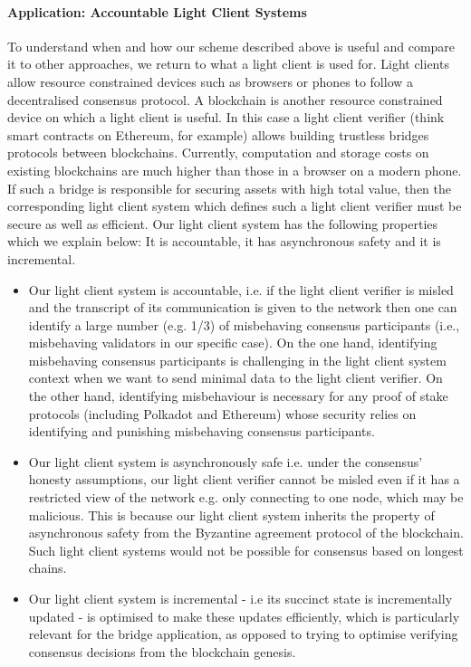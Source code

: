 \paragraph{Application: Accountable Light Client Systems} To understand when and how our scheme described above is useful and compare it to other 
approaches, we return to what a light client is used for. Light clients allow resource constrained devices such as browsers or phones to follow a decentralised 
consensus protocol. A blockchain is another resource constrained device on which a light client is useful. In this case a light client verifier (think smart contracts on 
Ethereum, for example) allows building trustless bridges protocols between blockchains. %
Currently, computation and storage 
costs on existing blockchains are much higher than those in a browser on a modern phone. If such a bridge is responsible for securing assets with high total value, 
then the corresponding light client system which defines such a light client verifier must be secure as well as efficient. Our light client system has the following properties 
which we explain below: It is accountable, it has asynchronous safety and it is incremental.  

\begin{itemize}
\item Our light client system is accountable, i.e. if the light client verifier is misled and the transcript of its communication is given to the network then one can identify a large 
number (e.g. 1/3) of misbehaving consensus participants (i.e., misbehaving validators in our specific case). On the one hand, identifying misbehaving consensus participants 
is challenging in the light client system context when we want to send minimal data to the light client verifier. On the other hand, 
identifying misbehaviour is necessary for any proof of stake protocols (including Polkadot and Ethereum) 
whose security relies on identifying and punishing misbehaving consensus participants. 
\item Our light client system is asynchronously safe i.e. under the consensus' honesty assumptions, our light client verifier cannot be misled even if it has a restricted view of the 
network e.g. only connecting to one node, which may be malicious. This is because our light client system inherits the property of asynchronous safety from the Byzantine agreement 
protocol of the blockchain. Such light client systems would not be possible for consensus based on longest chains.  
\item Our light client system is incremental - i.e its succinct state is incrementally updated - is optimised to make these updates efficiently, which is particularly relevant for the bridge 
application, as opposed to trying to optimise verifying consensus decisions from the blockchain genesis.
\end{itemize}

